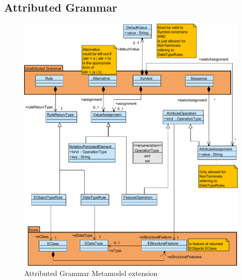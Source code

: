 \subsection{Attributed Grammar}
\begin{figure}
\centering
\includegraphics[scale=0.7]{gfx/ex/Grammar_Attributed} 
\caption{Attributed Grammar Metamodel extension}
\label{MM:AEBNF}
\end{figure}

